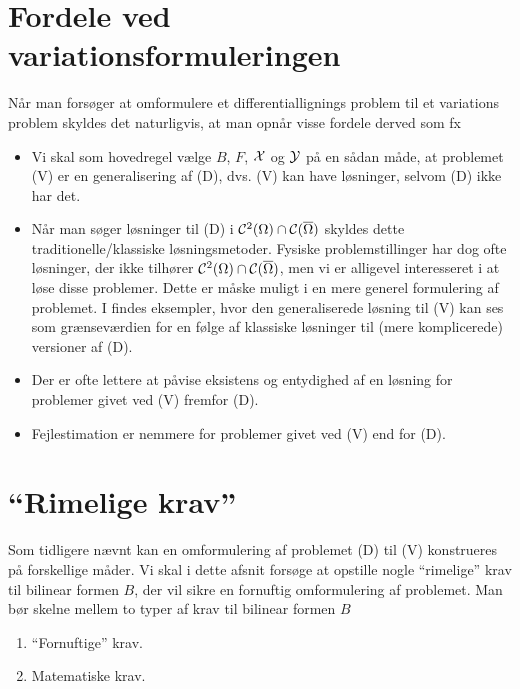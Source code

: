 \section{Fordele ved variationsformuleringen}
Når man forsøger at omformulere et differentiallignings problem til
et variations pro\-blem skyldes det naturligvis, at man opnår visse
fordele derved som fx
\begin{itemize}
  \item Vi skal som hovedregel vælge $B$, $F$, $\mathcal{X}$ og $\mathcal{Y}$ på en sådan måde, at
        problemet (V) er en generalisering af (D), dvs. (V) kan have
        løsninger, selvom (D) ikke har det.
  \item Når man søger løsninger til (D) i ${\mathcal{C}}^2(\Omega) \cap {\mathcal{C}}(\overline{\Omega})$ skyldes dette
        tra\-di\-ti\-o\-nel\-le/klas\-sis\-ke løsningsmetoder. Fysiske
        problemstillinger har dog ofte løsninger, der ikke tilhører 
        ${\mathcal{C}}^2(\Omega) \cap {\mathcal{C}}(\overline{\Omega})$, men vi er alligevel interesseret i at løse
        disse problemer. Dette er måske muligt i en mere generel formulering af
        problemet. I \cite{babuska82} findes eksempler, hvor den
        generaliserede løsning til (V) kan ses som grænseværdien for en følge af
        klassiske løsninger til (mere komplicerede) versioner af (D).
  \item Der er ofte lettere at påvise eksistens og entydighed af en
        løsning for problemer givet ved (V) fremfor (D).
  \item Fejlestimation er nemmere for problemer givet ved (V) end for (D). 
\end{itemize}  

\section{``Rimelige krav''} \label{rimeligekrav}
Som tidligere nævnt kan en omformulering af problemet (D) til (V)
konstrueres på forskellige måder. Vi skal i dette afsnit forsøge at
opstille nogle ``rimelige'' krav til bilinear formen $B$, der vil
sikre en fornuftig omformulering af problemet. Man bør skelne mellem
to typer af krav til bilinear formen $B$
\begin{enumerate}
  \item ``Fornuftige'' krav.
  \item Matematiske krav.
\end{enumerate}

